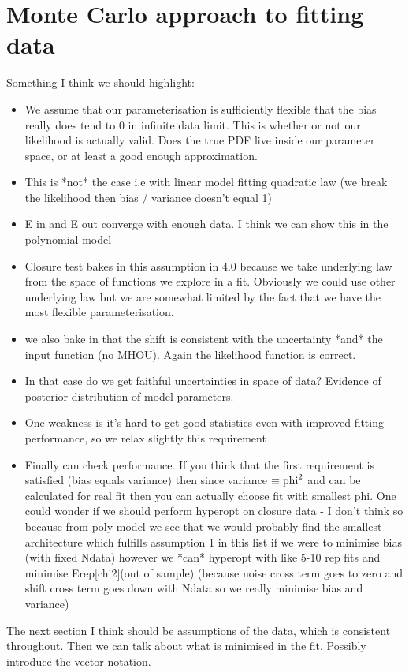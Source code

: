 \section{Monte Carlo approach to fitting data}
Something I think we should highlight:
\begin{itemize}
    \item We assume that our parameterisation is sufficiently flexible that
    the bias really does tend to 0 in infinite data limit. This is whether
    or not our likelihood is actually valid. Does the true PDF live inside
    our parameter space, or at least a good enough approximation.
    \item This is *not* the case i.e with linear model fitting quadratic law
    (we break the likelihood then bias / variance doesn't equal 1)
    \item E in and E out converge with enough data. I think we can show this
    in the polynomial model
    \item Closure test bakes in this assumption in 4.0 because we take underlying
    law from the space of functions we explore in a fit. Obviously we could use
    other underlying law but we are somewhat limited by the fact that we have the
    most flexible parameterisation.
    \item we also bake in that the shift is consistent with the uncertainty
    *and* the input function (no MHOU). Again the likelihood function is correct.
    \item In that case do we get faithful uncertainties in space of data?
    Evidence of posterior distribution of model parameters.
    \item One weakness is it's hard to get good statistics even with improved
    fitting performance, so we relax slightly this requirement
    \item Finally can check performance. If you think that the first requirement
    is satisfied (bias equals variance) then since variance $\equiv {\rm phi}^2$ and can be
    calculated for real fit then you can actually choose fit with smallest phi.
    One could wonder if we should perform hyperopt on closure data - I don't think
    so because from poly model we see that we would probably find the smallest
    architecture which fulfills assumption 1 in this list if we were to minimise
    bias (with fixed Ndata) however we *can* hyperopt with like 5-10 rep fits
    and minimise Erep[chi2](out of sample) (because noise cross term goes to zero
    and shift cross term goes down with Ndata so we really minimise bias and variance)
\end{itemize}
The next section I think should be assumptions of the data, which is consistent
throughout. Then we can talk about what is minimised in the fit. Possibly
introduce the vector notation.

